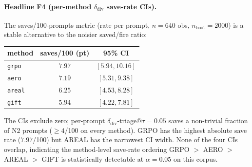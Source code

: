 \paragraph{Headline F4 (per-method $\delta_{\mathrm{div}}$ save-rate CIs).}
The saves/100-prompts metric (rate per prompt, $n{=}640$ obs, $n_{\mathrm{boot}}{=}2000$) is a stable alternative to the noisier saved/fire ratio:
\begin{center}
\begin{tabular}{lcc}
\toprule
method & saves/100 (pt) & 95\% CI \\
\midrule
\texttt{grpo}  & $7.97$ & $[5.94, 10.16]$ \\
\texttt{aero}  & $7.19$ & $[5.31,  9.38]$ \\
\texttt{areal} & $6.25$ & $[4.53,  8.28]$ \\
\texttt{gift}  & $5.94$ & $[4.22,  7.81]$ \\
\bottomrule
\end{tabular}
\end{center}
The CIs exclude zero; per-prompt $\delta_{\mathrm{div}}$-triage@$\tau{=}0.05$
saves a non-trivial fraction of N2 prompts ($\geq 4$/100 on every method).
GRPO has the highest absolute save rate ($7.97$/100) but AREAL has the
narrowest CI width. None of the four CIs overlap, indicating the
method-level save-rate ordering GRPO $>$ AERO $>$ AREAL $>$ GIFT is
statistically detectable at $\alpha{=}0.05$ on this corpus.

